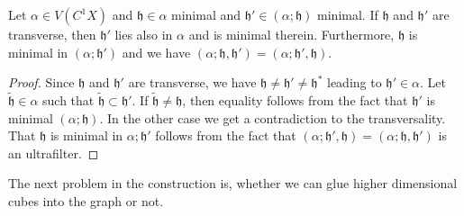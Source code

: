 \begin{lemma}
  Let \(\alpha \in V(C^1X)\) and \(\mathfrak{h} \in \alpha\) minimal and \(\mathfrak{h'} \in (\alpha; \mathfrak{h})\) minimal. If \(\mathfrak{h}\) and \(\mathfrak{h'}\) are transverse, then \(\mathfrak{h'}\) lies also in \(\alpha\) and is minimal therein. Furthermore, \(\mathfrak{h}\) is minimal in \((\alpha; \mathfrak{h'})\) and we have \((\alpha; \mathfrak{h}, \mathfrak{h'}) = (\alpha; \mathfrak{h'}, \mathfrak{h})\).
\end{lemma}

\begin{proof}
  Since \(\mathfrak{h}\) and \(\mathfrak{h'}\) are transverse, we have \(\mathfrak{h} \neq \mathfrak{h'} \neq \mathfrak{h}^\ast \) leading to \(\mathfrak{h'} \in \alpha\). Let \(\mathfrak{\tilde h} \in \alpha\) such that \(\mathfrak{\tilde h} \subset \mathfrak{h'}\). If \(\mathfrak{\tilde h} \neq \mathfrak{h}\), then equality follows from the fact that \(\mathfrak{h'}\) is minimal \((\alpha; \mathfrak{h})\). In the other case we get a contradiction to the transversality. That \(\mathfrak{h}\) is minimal in \(\alpha; \mathfrak{h'}\) follows from the fact that \((\alpha; \mathfrak{h'}, \mathfrak{h}) = (\alpha; \mathfrak{h}, \mathfrak{h'})\) is an ultrafilter.
\end{proof}

The next problem in the construction is, whether we can glue higher dimensional cubes into the graph or not.

